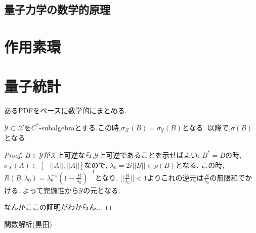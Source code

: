\documentclass[uplatex]{jsbook}
\begin{document}
\chapter{量子力学の数学的原理}


\part{作用素環}

\part{量子統計}
あるPDFをベースに数学的にまとめる.

\begin{thm}
$\mathcal{Y} \subset \mathcal{X}$を$C^*$-subalgebraとする.この時,$\sigma_{\mathcal{X}}(B) = \sigma_{\mathcal{Y}}(B)$となる.
以降で,$\sigma(B)$となる.
\end{thm}
\begin{proof}
$B \in \mathcal{Y}$が$\mathcal{X}$上可逆なら,$\mathcal{Y}$上可逆であることを示せばよい.
$B^*=B$の時,$\sigma_X(A) \subset [-||A||, ||A||]$なので,
$\lambda_0 = 2i||B|| \in \rho(B)$となる.
この時,$R(B, \lambda_0) = \lambda_0^{-1}(1 - \frac{B}{\lambda_0})^{-1}$となり,
$||\frac{B}{\lambda_0}|| < 1$よりこれの逆元は$\frac{B}{\lambda_0}$の無限和でかける.
よって完備性から$\mathcal{Y}$の元となる.

なんかここの証明がわからん...
\end{proof}

\begin{thebibliography}{99}
  関数解析(黒田)
\end{thebibliography}
\end{document}
